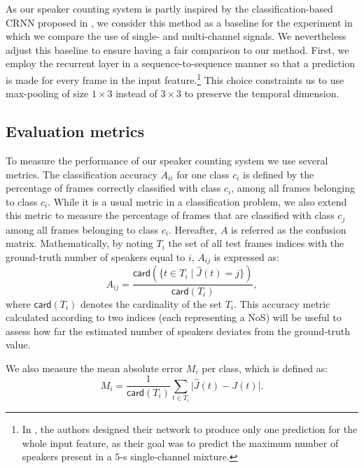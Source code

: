 As our speaker counting system is partly inspired by the classification-based CRNN proposed in \cite{stoter_countnet:_2019}, we consider this method as a baseline for the experiment in which we compare the use of single- and multi-channel signals. We nevertheless adjust this baseline to ensure having a fair comparison to our method. First, we employ the recurrent layer in a sequence-to-sequence manner so that a prediction is made for every frame in the input feature.\footnote{In \cite{stoter_countnet:_2019}, the authors designed their network to produce only one prediction for the whole input feature, as their goal was to predict the maximum number of speakers present in a $5$-s single-channel mixture.} This choice constraints us to use max-pooling of size $1 \times 3$ instead of $3 \times 3$ to preserve the temporal dimension.


\subsection{Evaluation metrics}

To measure the performance of our speaker counting system we use several metrics. The classification accuracy $A_{ii}$ for one class $c_i$ is defined by the percentage of frames correctly classified with class $c_i$, among all frames belonging to class $c_i$. While it is a usual metric in a classification problem, we also extend this metric to measure the percentage of frames that are classified with class $c_j$ among all frames belonging to class $c_i$. Hereafter, $A$ is referred as the confusion matrix. Mathematically, by noting $T_i$ the set of all test frames indices with the ground-truth number of speakers equal to $i$, $A_{ij}$ is expressed as:
\begin{equation}
    A_{ij} = \frac{\mathsf{card}(\{t \in T_i \mid \hat{J}(t) = j\})}{\mathsf{card}(T_i)},
\end{equation}
where $\mathsf{card}(T_i)$ denotes the cardinality of the set $T_i$.
This accuracy metric calculated according to two indices (each representing a NoS) will be useful to assess how far the estimated number of speakers deviates from the ground-truth value. 

We also measure the mean absolute error $M_i$ per class, which is defined as:
\begin{equation}
    M_i = \frac{1}{\mathsf{card}(T_i)} \sum_{t \in T_i} \lvert \hat{J}(t) - J(t) \rvert.
\end{equation}

